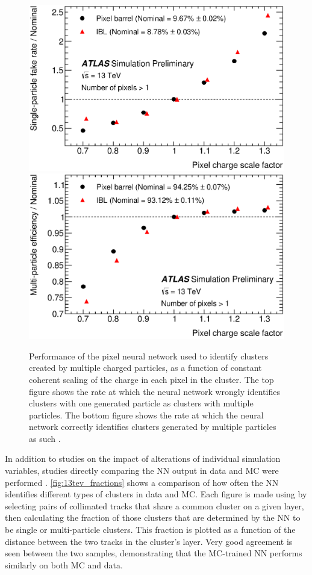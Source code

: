 \begin{centering}
\begin{figure}[bth]
\myfloatalign
\includegraphics[width=.9\linewidth]{figures/nn/fig_05a.eps}
\includegraphics[width=.9\linewidth]{figures/nn/fig_05b.eps}
\caption{Performance of the pixel neural network used to identify clusters created by multiple charged particles, as a function of constant coherent scaling of the charge in each pixel in the cluster. The top figure shows the rate at which the neural network wrongly identifies clusters with one generated particle as clusters with multiple particles. The bottom figure shows the rate at which the neural network correctly identifies clusters generated by multiple particles as such \cite{ATL-PHYS-PUB-2015-052}.}
\label{fig:13tev_charge_robustness}
\end{figure}
\end{centering}

In addition to studies on the impact of alterations of individual simulation variables, studies directly comparing the \ac{NN} output in data and \ac{MC} were performed \cite{ATL-PHYS-PUB-2015-044}. \autoref{fig:13tev_fractions} shows a comparison of how often the \ac{NN} identifies different types of clusters in data and \ac{MC}. Each figure is made using by selecting pairs of collimated tracks that share a common cluster on a given layer, then calculating the fraction of those clusters that are determined by the \ac{NN} to be single or multi-particle clusters. This fraction is plotted as a function of the distance between the two tracks in the cluster's layer. Very good agreement is seen between the two samples, demonstrating that the \ac{MC}-trained \ac{NN} performs similarly on both \ac{MC} and data.

